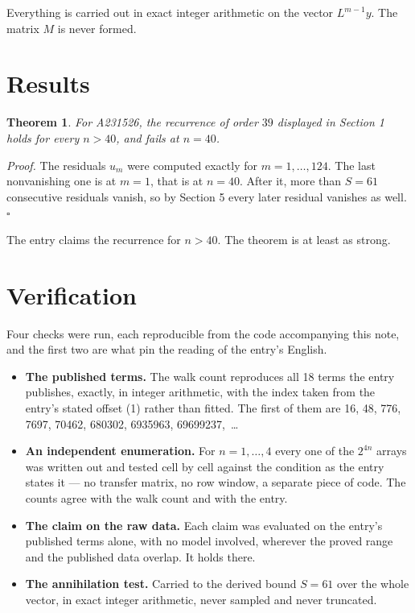 \documentclass[11pt]{article}
\newtheorem{theorem}{Theorem}
\theoremstyle{definition}
\begin{document}
Everything is carried out in exact integer arithmetic on the vector $L^{m-1}y$. The matrix $M$ is never formed.

\section{Results}

\begin{theorem} For A231526, the recurrence of order $39$ displayed in Section 1 holds for every $n > 40$, and fails at $n = 40$.\end{theorem}

{\itshape Proof.} The residuals $u_m$ were computed exactly for $m = 1,\dots,124$. The last nonvanishing one is at $m = 1$, that is at $n = 40$. After it, more than $S = 61$ consecutive residuals vanish, so by Section 5 every later residual vanishes as well. $\square$

The entry claims the recurrence for $n > 40$. The theorem is at least as strong.

\section{Verification}

Four checks were run, each reproducible from the code accompanying this note, and the first two are what pin the reading of the entry's English.

\begin{itemize}

\item {\bfseries The published terms.} The walk count reproduces all 18 terms the entry publishes, exactly, in integer arithmetic, with the index taken from the entry's stated offset (1) rather than fitted. The first of them are 16, 48, 776, 7697, 70462, 680302, 6935963, 69699237,~\dots

\item {\bfseries An independent enumeration.} For $n = 1,\dots,4$ every one of the $2^{4n}$ arrays was written out and tested cell by cell against the condition as the entry states it --- no transfer matrix, no row window, a separate piece of code. The counts agree with the walk count and with the entry.

\item {\bfseries The claim on the raw data.} Each claim was evaluated on the entry's published terms alone, with no model involved, wherever the proved range and the published data overlap. It holds there.

\item {\bfseries The annihilation test.} Carried to the derived bound $S = 61$ over the whole vector, in exact integer arithmetic, never sampled and never truncated.

\end{itemize}
\end{document}
